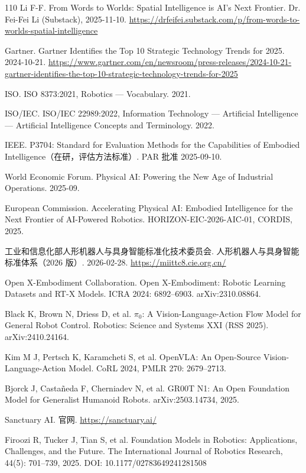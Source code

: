 \documentclass[10pt,fontset=fandol]{ctexart}
\begin{document}
\begin{thebibliography}{110}
Li F-F. From Words to Worlds: Spatial Intelligence is AI's Next Frontier. Dr. Fei-Fei Li (Substack), 2025-11-10. \url{https://drfeifei.substack.com/p/from-words-to-worlds-spatial-intelligence}

Gartner. Gartner Identifies the Top 10 Strategic Technology Trends for 2025. 2024-10-21. \url{https://www.gartner.com/en/newsroom/press-releases/2024-10-21-gartner-identifies-the-top-10-strategic-technology-trends-for-2025}

ISO. ISO 8373:2021, Robotics — Vocabulary. 2021.

ISO/IEC. ISO/IEC 22989:2022, Information Technology — Artificial Intelligence — Artificial Intelligence Concepts and Terminology. 2022.

IEEE. P3704: Standard for Evaluation Methods for the Capabilities of Embodied Intelligence（在研，评估方法标准）. PAR 批准 2025-09-10.

World Economic Forum. Physical AI: Powering the New Age of Industrial Operations. 2025-09.

European Commission. Accelerating Physical AI: Embodied Intelligence for the Next Frontier of AI-Powered Robotics. HORIZON-EIC-2026-AIC-01, CORDIS, 2025.

工业和信息化部人形机器人与具身智能标准化技术委员会. 人形机器人与具身智能标准体系（2026 版）. 2026-02-28. \url{https://miittc8.cie.org.cn/}

Open X-Embodiment Collaboration. Open X-Embodiment: Robotic Learning Datasets and RT-X Models. ICRA 2024: 6892–6903. arXiv:2310.08864.

Black K, Brown N, Driess D, et al. $\pi_0$: A Vision-Language-Action Flow Model for General Robot Control. Robotics: Science and Systems XXI (RSS 2025). arXiv:2410.24164.

Kim M J, Pertsch K, Karamcheti S, et al. OpenVLA: An Open-Source Vision-Language-Action Model. CoRL 2024, PMLR 270: 2679–2713.

Bjorck J, Castañeda F, Cherniadev N, et al. GR00T N1: An Open Foundation Model for Generalist Humanoid Robots. arXiv:2503.14734, 2025.

Sanctuary AI. 官网. \url{https://sanctuary.ai/}

Firoozi R, Tucker J, Tian S, et al. Foundation Models in Robotics: Applications, Challenges, and the Future. The International Journal of Robotics Research, 44(5): 701–739, 2025. DOI: 10.1177/02783649241281508


\end{thebibliography}
\end{document}

